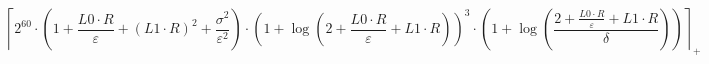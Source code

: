 \[\left\lceil 2^{60} \cdot \left(1 + \frac{L0 \cdot R}{\varepsilon} + \left(L1 \cdot R\right)^{2} + \frac{\sigma^{2}}{\varepsilon^{2}}\right) \cdot \left(1 + \log\left(2 + \frac{L0 \cdot R}{\varepsilon} + L1 \cdot R\right)\right)^{3} \cdot \left(1 + \log\left(\frac{2 + \frac{L0 \cdot R}{\varepsilon} + L1 \cdot R}{\delta}\right)\right) \right\rceil_{+}\]
